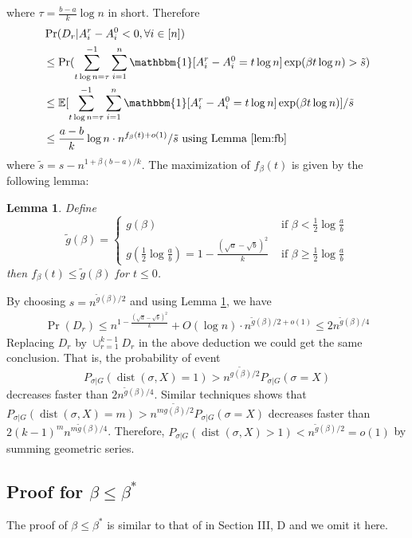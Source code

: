 \documentclass[conference]{IEEEtran}
\newtheorem{lemma}{Lemma}
\DeclareMathOperator{\dist}{dist}
\begin{document}
	where $\tau =\frac{b-a}{k}\log n$ in short. Therefore
	\begin{align*}
	&\Pr(D_r | A_i^r - A_i^0  < 0, \forall i\in [n])  \\
	&\leq\Pr(\sum_{t\log n =\tau}^{-1}\sum_{i=1}^n \mathbbm{1}[A^r_i - A^0_i = t\log n]\exp ( \beta  t\log n)  > \tilde{s} ) \\
	& \leq \mathbb{E}[\sum_{t\log n =\tau}^{-1}\sum_{i=1}^n \mathbbm{1}[A^r_i - A^0_i= t\log n]\exp ( \beta  t\log n)] /  \tilde{s} \\
	& \leq \frac{a-b}{k}\log n \cdot n^{f_{\beta}(t) + o(1)} / \tilde{s} \textrm{ using Lemma \ref{lem:fb} }
	\end{align*}
	where $\tilde{s} = s - n^{1+\beta(b-a)/k}$. 
	The maximization of $f_{\beta}(t)$ is given by the following lemma:
	\begin{lemma}\label{lem:tilde_g}
		Define
		$$
		\tilde{g}(\beta) = \begin{cases}
		g(\beta)   & \text{~if~} \beta< \frac{1}{2}\log\frac{a}{b} \\
		g(\frac{1}{2} \log\frac{a}{b}) = 1 - \frac{(\sqrt{a}-\sqrt{b})^2}{k} & \text{~if~} \beta\ge \frac{1}{2}\log\frac{a}{b}
		\end{cases}
		$$
		then $f_{\beta}(t) \leq \tilde{g}(\beta)$ for $t\leq 0$.
	\end{lemma}
	By choosing $s = n^{\tilde{g}(\beta)/2}$ and using Lemma \ref{lem:tilde_g}, we have
	\begin{align*}
	\Pr( D_r) \leq  n^{1-\frac{(\sqrt{a}-\sqrt{b})^2}{k}} + O(\log n)  \cdot n^{\tilde{g}(\beta)/2 + o(1)} \leq 2n^{\tilde{g}(\beta)/4}
	\end{align*}
	Replacing $D_r$ by $\cup_{r=1}^{k-1} D_r$ in the above deduction we could get the same conclusion.
	That is, the probability of event
	$$
	P_{\sigma | G}(\dist(\sigma, X) = 1) > n^{\tilde{g(\beta)}/2}P_{\sigma | G}(\sigma = X)\label{eq:betastar_xx}
	$$
	decreases faster than $2n^{\tilde{g}(\beta)/4}$.
	Similar techniques shows that $P_{\sigma | G}(\dist(\sigma, X) = m)> n^{m\tilde{g(\beta)}/2}P_{\sigma | G}(\sigma = X)$
	decreases faster than $2(k-1)^m n^{m\tilde{g}(\beta)/4}$. Therefore, $P_{\sigma | G}(\dist(\sigma, X) > 1) < n^{\tilde{g}(\beta)/2} = o(1)$ by summing geometric series.
	
	\subsection{Proof for $\beta\le\beta^\ast$}\label{subsect:smaller}
	The proof of $\beta\le\beta^\ast$ is similar to that of \cite{ye2020exact} in Section III, D and we omit it here.
	
\end{document}
